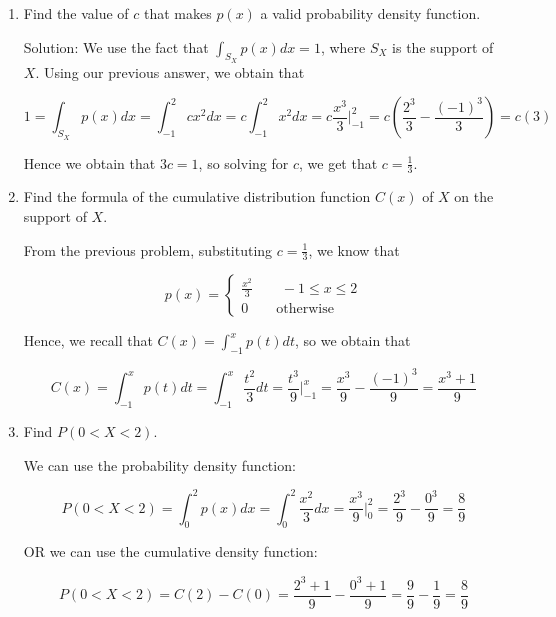 \documentclass[11pt]{article}
\begin{document}
\begin{enumerate}
\begin{enumerate}
    \vfill

    \item Find the value of $c$ that makes $p(x)$ a valid probability density function.

    {\color{blue}Solution: We use the fact that $\int_{S_X} p(x) dx = 1$, where $S_X$ is the support of $X$. Using our previous answer, we obtain that

    $$1 = \int_{S_X} p(x) dx = \int_{-1}^2 cx^2 dx = c \int_{-1}^2 x^2 dx = c \frac{x^3}{3} \bigg|_{-1}^2 = c \left( \frac{2^3}{3} - \frac{(-1)^3}{3} \right) = c (3)$$
    
    Hence we obtain that $3c = 1$, so solving for $c$, we get that $c = \frac{1}{3}$.}

    \vfill
    
    \item Find the formula of the cumulative distribution function $C(x)$ of $X$ on the support of $X$.

    {\color{blue}From the previous problem, substituting $c = \frac{1}{3}$, we know that 

    \[p(x)=\begin{cases}\frac{x^2}{3}\qquad -1\le x\le 2\\ 0 \qquad \text{otherwise}\end{cases}\]
    
    Hence, we recall that $C(x) = \int_{-1}^x p(t) dt$, so we obtain that

    $$C(x) = \int_{-1}^x p(t) dt = \int_{-1}^x \frac{t^2}{3} dt = \frac{t^3}{9} \bigg|_{-1}^x = \frac{x^3}{9} - \frac{(-1)^3}{9} = \frac{x^3 + 1}{9}$$}

    \vfill

    \item Find $P(0<X<2)$.

    {\color{blue} We can use the probability density function:
    
    $$P(0<X<2) = \int_0^2 p(x) dx = \int_0^2 \frac{x^2}{3} dx = \frac{x^3}{9} \bigg|_0^2 = \frac{2^3}{9} - \frac{0^3}{9} = \frac{8}{9}$$
    
    OR we can use the cumulative density function:
    
    $$P(0<X<2) = C(2) - C(0) = \frac{2^3 + 1}{9} - \frac{0^3 + 1}{9} = \frac{9}{9} - \frac{1}{9} = \frac{8}{9}$$}

    \vfill
\end{enumerate}


\end{enumerate}
\end{document}
